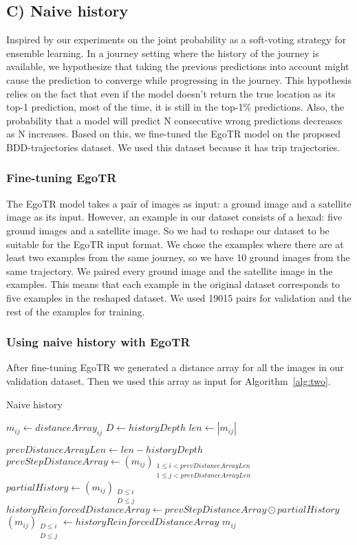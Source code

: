 \documentclass[10pt,letterpaper]{article}
\begin{document}
\subsection*{C) Naive history}
Inspired by our experiments on the joint probability as a soft-voting strategy for ensemble learning. In a journey setting where the history of the journey is available, we hypothesize that taking the previous predictions into account might cause the prediction to converge while progressing in the journey. This hypothesis relies on the fact that even if the model doesn't return the true location as its top-1 prediction, most of the time, it is still in the top-1\% predictions. Also, the probability that a model will predict N consecutive wrong predictions decreases as N increases. Based on this, we fine-tuned the EgoTR model on the proposed BDD-trajectories dataset. We used this dataset because it has trip trajectories.

\subsubsection*{Fine-tuning EgoTR}
The EgoTR model takes a pair of images as input: a ground image and a satellite image as its input. However, an example in our dataset consists of a hexad: five ground images and a satellite image. So we had to reshape our dataset to be suitable for the EgoTR input format. We chose the examples where there are at least two examples from the same journey, so we have 10 ground images from the same trajectory. We paired every ground image and the satellite image in the examples. This means that each example in the original dataset corresponds to five examples in the reshaped dataset. We used 19015 pairs for validation and the rest of the examples for training.

\subsubsection*{Using naive history with EgoTR}
After fine-tuning EgoTR we generated a distance array for all the images in our validation dataset. Then we used this array as input for Algorithm~\ref{alg:two}.

\begin{algorithm}[H]
  \label{algorithm2}
  \caption{Naive history}\label{alg:two}
  $m_{ij} \gets distanceArray_{ij}$\;
  $D \gets historyDepth$\;
  $len \gets |m_{ij}|$\;
  
   {
      $prevDistanceArrayLen \gets len - historyDepth$\;
      $prevStepDistanceArray \gets (m_{ij})_{\substack{1\le i < prevDistanceArrayLen \\ 1\le j < prevDistanceArrayLen }}$\;
      $partialHistory \gets (m_{ij})_{\substack{D \le i \\ D \le j}}$\;
      $historyReinforcedDistanceArray \gets prevStepDistanceArray \odot partialHistory$\;
      $(m_{ij})_{\substack{D \le i \\ D \le j}} \gets historyReinforcedDistanceArray$\;
  }
  \Return $m_{ij}$\;
\end{algorithm}
\end{document}
